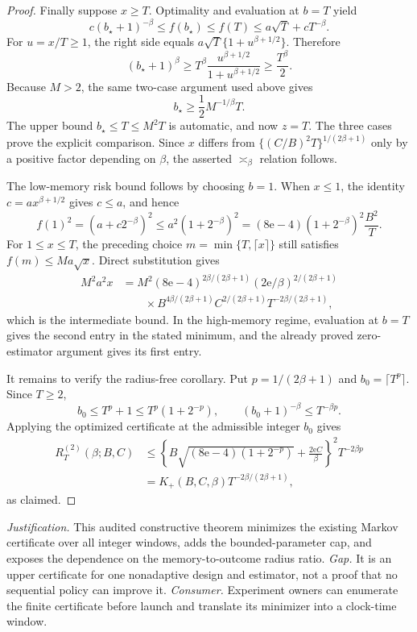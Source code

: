 \documentclass{article}
\begin{document}
\begin{proof}
Finally suppose \(x\ge T\).  Optimality and evaluation at \(b=T\) yield
\[
 c(b_\star+1)^{-\beta}
 \le f(b_\star)\le f(T)
 \le a\sqrt T+cT^{-\beta}.
\]
For \(u=x/T\ge1\), the right side equals \(a\sqrt T\{1+u^{\beta+1/2}\}\).  Therefore
\[
 (b_\star+1)^\beta
 \ge T^\beta\frac{u^{\beta+1/2}}{1+u^{\beta+1/2}}
 \ge\frac{T^\beta}{2}.
\]
Because \(M>2\), the same two-case argument used above gives
\[
 b_\star\ge\frac12M^{-1/\beta}T.
\]
The upper bound \(b_\star\le T\le M^2T\) is automatic, and now \(z=T\).  The three cases prove the explicit comparison.  Since \(x\) differs from \(\{(C/B)^2T\}^{1/(2\beta+1)}\) only by a positive factor depending on \(\beta\), the asserted \(\asymp_\beta\) relation follows.

The low-memory risk bound follows by choosing \(b=1\).  When \(x\le1\), the identity \(c=ax^{\beta+1/2}\) gives \(c\le a\), and hence
\[
 f(1)^2=(a+c2^{-\beta})^2
 \le a^2(1+2^{-\beta})^2
 =(8\mathrm e-4)(1+2^{-\beta})^2\frac{B^2}{T}.
\]
For \(1\le x\le T\), the preceding choice \(m=\min\{T,\lceil x\rceil\}\) still satisfies \(f(m)\le M a\sqrt x\).  Direct substitution gives
\[
 \begin{aligned}
 M^2a^2x
 &=M^2(8\mathrm e-4)^{2\beta/(2\beta+1)}
 (2\mathrm e/\beta)^{2/(2\beta+1)}\\
 &\qquad\times
 B^{4\beta/(2\beta+1)}C^{2/(2\beta+1)}
 T^{-2\beta/(2\beta+1)},
 \end{aligned}
\]
which is the intermediate bound.  In the high-memory regime, evaluation at \(b=T\) gives the second entry in the stated minimum, and the already proved zero-estimator argument gives its first entry.

It remains to verify the radius-free corollary.  Put \(p=1/(2\beta+1)\) and \(b_0=\lceil T^p\rceil\).  Since \(T\ge2\),
\[
 b_0\le T^p+1\le T^p(1+2^{-p}),
 \qquad
 (b_0+1)^{-\beta}\le T^{-\beta p}.
\]
Applying the optimized certificate at the admissible integer \(b_0\) gives
\[
 \begin{aligned}
 R_T^{(2)}(\beta;B,C)
 &\le
 \left\{
 B\sqrt{(8\mathrm e-4)(1+2^{-p})}
 +\frac{2\mathrm e C}{\beta}
 \right\}^2T^{-2\beta p}\\
 &=K_+(B,C,\beta)T^{-2\beta/(2\beta+1)},
 \end{aligned}
\]
as claimed.
\end{proof}
\par\smallskip\noindent \textit{Justification.} This audited constructive theorem minimizes the existing Markov certificate over all integer windows, adds the bounded-parameter cap, and exposes the dependence on the memory-to-outcome radius ratio. \textit{Gap.} It is an upper certificate for one nonadaptive design and estimator, not a proof that no sequential policy can improve it. \textit{Consumer.} Experiment owners can enumerate the finite certificate before launch and translate its minimizer into a clock-time window.
\end{document}
